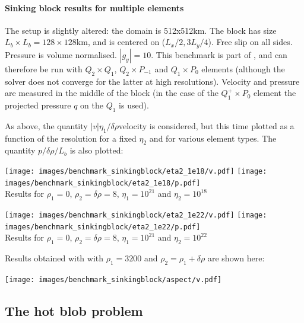\paragraph{Sinking block results for multiple elements}

The setup is slightly altered: the domain is 512x512km. 
The block has size $L_b\times L_b=128\times 128$km, and is centered
on ($L_x/2,3L_y/4$). Free slip on all sides. Pressure is volume normalised. $|g_y|=10$.
This benchmark is part of \aspect, and can therefore be run with $Q_2\times Q_1$, $Q_2\times P_{-1}$ and $Q_1\times P_0$ elements (although the solver does not converge for the latter at high resolutions).
Velocity and pressure are measured in the middle of the block (in the case of the $Q_1^+\times P_0$ element the 
projected pressure $q$ on the $Q_1$ is used).

As above, the quantity $|v|\eta_1/\delta\rho$velocity is considered, but this time plotted as a function 
of the resolution for a fixed $\eta_2$ and for various element types. The quantity $p/\delta\rho/L_b$
is also plotted:

\begin{center}
\texttt{[image: images/benchmark\_sinkingblock/eta2\_1e18/v.pdf]}
\texttt{[image: images/benchmark\_sinkingblock/eta2\_1e18/p.pdf]}\\
{\captionfont Results for $\rho_1=0$, $\rho_2=\delta\rho=8$, $\eta_1=10^{21}$ and $\eta_2=10^{18}$}
\end{center}

\begin{center}
\texttt{[image: images/benchmark\_sinkingblock/eta2\_1e22/v.pdf]}
\texttt{[image: images/benchmark\_sinkingblock/eta2\_1e22/p.pdf]}\\
{\captionfont Results for $\rho_1=0$, $\rho_2=\delta\rho=8$, $\eta_1=10^{21}$ and $\eta_2=10^{22}$}
\end{center}

Results obtained with \aspect with $\rho_1=3200$ and $\rho_2=\rho_1+\delta\rho$ are shown here:

\begin{center}
\texttt{[image: images/benchmark\_sinkingblock/aspect/v.pdf]}
\end{center}


\subsection{The hot blob problem}\label{sec:hotblob}

